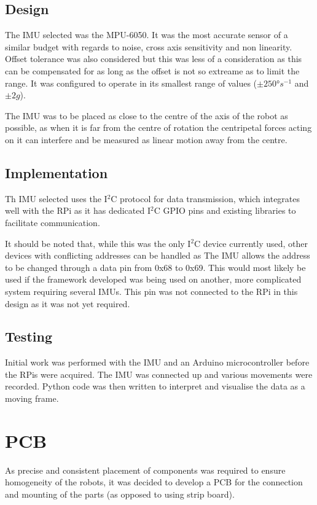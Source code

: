 \subsection{Design}\label{elec/imu/design}
The IMU selected was the MPU-6050. It was the most accurate sensor of a similar budget with regards to noise, cross axis sensitivity and non linearity. Offset tolerance was also considered but this was less of a consideration as this can be compensated for as long as the offset is not so extreame as to limit the range. It was configured to operate in its smallest range of values ($\pm\ang{250}s^{-1}$ and $\pm2g$\cite{}).

The IMU was to be placed as close to the centre of the axis of the robot as possible, as when it is far from the centre of rotation the centripetal forces acting on it can interfere and be measured as linear motion away from the centre.  

\subsection{Implementation}\label{elec/imu/impl}

Th IMU selected uses the I$^2$C protocol for data transmission, which integrates well with the RPi as it has dedicated I$^2$C GPIO pins and existing libraries to facilitate communication. 

It should be noted that, while this was the only I$^2$C device currently used, other devices with conflicting addresses can be handled as The IMU allows the address to be changed through a data pin from 0x68 to 0x69. This would most likely be used if the framework developed was being used on another, more complicated system requiring several IMUs. This pin was not connected to the RPi in this design as it was not yet required. 

\subsection{Testing}\label{elec/imu/test}
Initial work was performed with the IMU and an Arduino microcontroller before the RPis were acquired. The IMU was connected up and various movements were recorded. Python code was then written to interpret and visualise the data as a moving frame. 



\section{PCB}\label{elec/pcb}
As precise and consistent placement of components was required to ensure homogeneity of the robots, it was decided to develop a PCB for the connection and mounting of the parts (as opposed to using strip board).  
